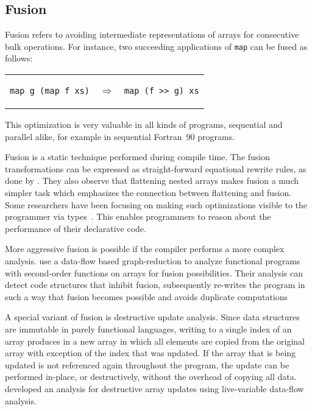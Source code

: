 \documentclass[a4paper]{article}
\begin{document}
\subsection{Fusion}
\label{sec:fusion}

Fusion refers to avoiding intermediate representations of arrays for
consecutive bulk operations. For instance, two succeeding applications
of \texttt{map} can be fused as follows:

\begin{center}
  \begin{tabular}{ccc}
\begin{lstlisting}[language=ML]
map g (map f xs)
\end{lstlisting}
    & $\Longrightarrow$ &
\begin{lstlisting}[language=ML]
map (f >> g) xs
\end{lstlisting}
  \end{tabular}
\end{center}

This optimization is very valuable in all kinds of programs,
sequential and parallel alike, for example in sequential
Fortran~90 programs\cite{Hwang:1995:AOS:209936.209949}.

Fusion is a static technique performed during compile time. The fusion
transformations can be expressed as straight-forward equational
rewrite rules, as done by
\citet{Chakravarty:2001:FAF:507635.507661}. They also observe that
flattening nested arrays makes fusion a much simpler task which
emphasizes the connection between flattening and fusion. Some
researchers have been focusing on making such optimizations visible to
the programmer via
types~\cite{Lippmeier:2012:GPA:2364506.2364511}. This enables
programmers to reason about the performance of their declarative code.

More aggressive fusion is possible if the compiler performs a more
complex analysis. \citet{Henriksen:2013:TGA:2502323.2502328} use a
data-flow based graph-reduction to analyze functional programs with
second-order functions on arrays for fusion possibilities. Their
analysis can detect code structures that inhibit fusion, subsequently
re-writes the program in such a way that fusion becomes possible and
avoids duplicate computations

A special variant of fusion is destructive update analysis. Since data
structures are immutable in purely functional languages, writing to a
single index of an array produces in a new array in which all elements
are copied from the original array with exception of the index that
was updated. If the array that is being updated is not referenced
again throughout the program, the update can be performed in-place, or
destructively, without the overhead of copying all
data. \citet{Sastry:1994:PDU:182409.182486} developed an analysis for
destructive array updates using live-variable data-flow analysis.
\end{document}

